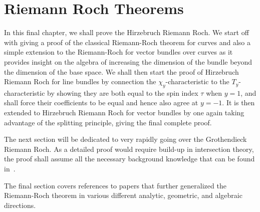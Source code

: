\documentclass{ut-thesis}
\begin{document}
%


\chapter{Riemann Roch Theorems}\label{cha:RR}


In this final chapter, we shall prove the Hirzebruch Riemann Roch. We start off with giving a proof of the
classical Riemann-Roch theorem for curves and also a simple extension to the Riemann-Roch for vector bundles
over curves as it provides insight on the algebra of increasing the dimension of the bundle beyond the
dimension of the base space. We shall then start the proof of Hirzebruch Riemann Roch for line bundles by connection the
$\chi_y$-characteristic to the $T_y$-characteristic by showing they are both equal to the spin index $\tau$
when $y =1$, and shall force their coefficients to be equal and hence also agree at $y=-1$. It is then extended to
Hirzebruch Riemann Roch for vector bundles by one again taking advantage of the splitting principle, giving
the final complete proof.

The next section will be dedicated to very rapidly going over the Grothendieck Riemann
Roch. As a detailed proof would require build-up in intersection theory, the proof shall assume all the
necessary background knowledge that can be found in~\cite{fultonIntersectionTheory1984}.


The final section covers references to papers that further generalized the Riemann-Roch theorem in various
different analytic, geometric, and algebraic directions.
\end{document}
